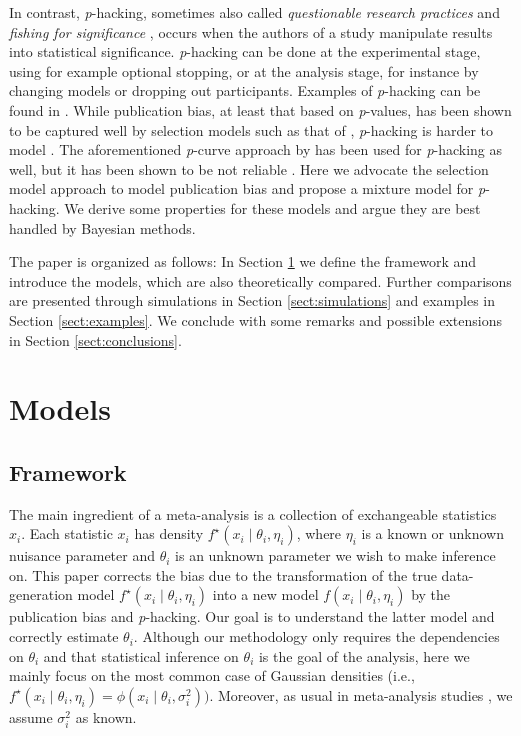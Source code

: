 \documentclass[useAMS,usenatbib,referee]{biom}
\begin{document}
In contrast, \textit{p}-hacking, sometimes also called \emph{questionable research practices} \citep{Sijtsma2016} and \emph{fishing for significance} \citep{Boulesteix2009}, occurs when the authors of a study manipulate results into statistical significance. \textit{p}-hacking can be done at the experimental stage, using for example optional stopping, or at the analysis stage, for instance by changing models or dropping out participants. Examples of \textit{p}-hacking can be found in \citet{simmons2011false}. While publication bias, at least that based on \textit{p}-values, has been shown to be captured well by selection models such as that of \citet{hedges1992modeling}, \textit{p}-hacking is harder to model \citep{carter2019correcting}. The aforementioned \textit{p}-curve approach by \citet{simonsohn2014p} has been used for \textit{p}-hacking as well, but it has been shown to be not reliable \citep{BrunsIoannidis2016}. Here we advocate the selection model approach to model publication bias and propose a mixture model for \textit{p}-hacking. We derive some properties for these models and argue they are best handled by Bayesian methods. 

The paper is organized as follows: In Section \ref{sect:models} we define the framework and introduce the models, which are also theoretically compared. Further comparisons are presented through simulations in Section \ref{sect:simulations} and examples in Section \ref{sect:examples}. We conclude with some remarks and possible extensions in Section \ref{sect:conclusions}.

\section{Models}\label{sect:models}

\subsection{Framework}
The main ingredient of a meta-analysis is a collection of exchangeable statistics $x_{i}$. Each statistic $x_{i}$ has density $f^{\star}(x_{i}\mid\theta_{i},\eta_{i})$, where $\eta_i$ is a known or unknown nuisance parameter and $\theta_{i}$ is an unknown parameter we wish to make inference on. This paper corrects the bias due to the transformation of the true data-generation model $f^{\star}(x_i \mid \theta_i , \eta_i )$ into a new model $f(x_{i}\mid\theta_{i},\eta_{i})$ by the publication bias and \textit{p}-hacking. Our goal is to understand the latter model and correctly estimate $\theta_{i}$. Although our methodology only requires the dependencies on $\theta_{i}$ and that statistical inference on $\theta_{i}$ is the goal of the analysis, here we mainly focus on the most common case of Gaussian densities (i.e., $f^{\star}(x_{i}\mid\theta_{i},\eta_{i}) = \phi(x_{i}\mid \theta_i, \sigma_i^2) )$. Moreover, as usual in meta-analysis studies \citep{vanHouwelingen2002}, we assume $\sigma_i^2$ as known.
\end{document}
